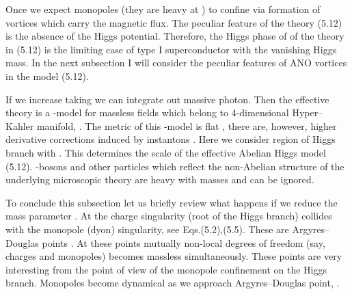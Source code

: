 \documentclass[a4paper,12pt]{article}
\def\ga{\mathrel{\mathpalette\fun >}}
\def\fun#1#2{\lower3.6pt\vbox{\baselineskip0pt\lineskip.9pt
\ialign{\myHighlight{$\mathsurround=0pt#1\hfil##\hfil$}\coordHE{}\crcr#2\crcr\sim\crcr}}}
\begin{document}
Once \coordHE{} we expect monopoles (they are heavy at
\coordHE{}) to confine via formation of vortices which carry
the magnetic flux. The peculiar feature of the theory (5.12) is
the absence of the Higgs potential. Therefore, the Higgs phase of
of the theory in
(5.12) is the limiting case of type I superconductor with the
vanishing Higgs mass. In the next subsection I will consider the
peculiar features of ANO vortices in the model (5.12).

If we increase \coordHE{} taking \myHighlight{$v^2_\alpha\ga\Lambda^2$}\coordHE{} we
can integrate out massive photon. Then the effective theory is a
\myHighlight{$\sigma$}\coordHE{}-model for massless fields \coordHE{} which belong to
4-dimensional Hyper--Kahler manifold, \coordHE{}. The metric of
this \myHighlight{$\sigma$}\coordHE{}-model is flat \cite{SW2,APS}, there are, however,
higher derivative corrections induced by instantons \cite{Y2}. 
Here we consider region of Higgs branch with
\coordHE{}. This determines the scale of the
effective Abelian Higgs model (5.12). \coordHE{}-bosons and other
particles which reflect the non-\-Abelian structure of the
underlying microscopic theory are heavy with masses
\myHighlight{$\ga\Lambda_2$}\coordHE{} and can be ignored.

To conclude this subsection let us briefly review what happens if
we reduce the mass parameter \coordHE{}. At \coordHE{} the charge
singularity (root of the Higgs branch) collides with the monopole
(dyon) singularity, see Eqs.(5.2),(5.5). These are
Argyres--Douglas points \cite{AD,APSW}. At these points mutually
non-\-local degrees of freedom (say, charges and monopoles)
becomes massless simultaneously. These points are very
interesting from the point of view of the monopole confinement on
the Higgs branch. Mono\-pol\-es become
dynamical as we approach Argyres--Douglas point, \coordHE{}.
\end{document}
